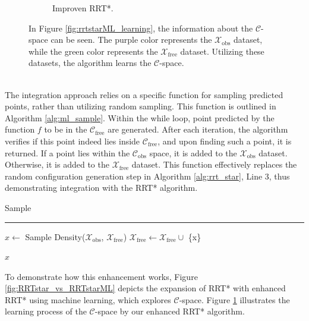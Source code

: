 \documentclass{ctuthesis}
\begin{document}
\begin{figure}[!ht]
\begin{subfigure}[b]{0.45\textwidth}
      \caption{Improven RRT*.}
  \end{subfigure}
  \caption{In Figure \ref{fig:rrtstarML_learning}, 
  the information about the $\mathcal{C}$-space can be seen. 
  The purple color represents the \( \mathcal{X}_{\text{obs}} \) dataset, 
  while the green color represents the \( \mathcal{X}_{\text{free}} \) dataset. 
  Utilizing these datasets, the algorithm learns the $\mathcal{C}$-space.}
  \label{fig:LearningConfigSpace}
\end{figure}
\\[12pt]
The integration approach relies on a specific function for sampling predicted points,
rather than utilizing random sampling. 
This function is outlined in Algorithm \ref{alg:ml_sample}. 
Within the while loop, 
point predicted by the function $f$ to be in the $\mathcal{C}_{\text{free}}$ are generated. 
After each iteration, 
the algorithm verifies if this point indeed lies inside $\mathcal{C}_{\text{free}}$, 
and upon finding such a point, it is returned. 
If a point lies within the $\mathcal{C}_{\text{obs}}$ space, 
it is added to the $\mathcal{X}_{\text{obs}}$ dataset.
Otherwise, it is added to the $\mathcal{X}_{\text{free}}$ dataset.
This function effectively replaces the random configuration generation step 
in Algorithm \ref{alg:rrt_star}, Line 3, thus demonstrating integration with the RRT* algorithm.
\\[12pt] 
\begin{algorithm}[H]
  \caption{Sample}
  \label{alg:ml_sample}
  \vspace{0.1cm}
  \hrule
  \vspace{0.2cm}
  $x \gets$ Sample Density($\mathcal{X}_{\text{obs}}$, $\mathcal{X}_{\text{free}}$)\; 
  $\mathcal{X}_{\text{free}} \gets \mathcal{X}_{\text{free}} \cup$ \{x\}\;
  
  \Return $x$\;
\end{algorithm}
\vspace{1em}
\noindent To demonstrate how this enhancement works, 
Figure \ref{fig:RRTstar_vs_RRTstarML} depicts the expansion of RRT* with enhanced RRT* using 
machine learning, which explores $\mathcal{C}$-space. 
Figure \ref{fig:LearningConfigSpace} illustrates 
the learning process of the $\mathcal{C}$-space by our enhanced RRT* algorithm.
\end{document}
